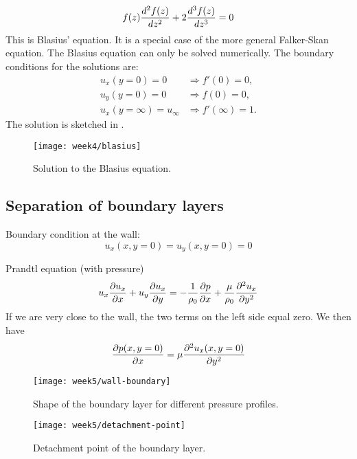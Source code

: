 \begin{equation}
f(z)\frac{d^2 f(z)}{d z^2}+2\frac{d^3 f(z)}{d z^3}=0
\end{equation}
This is Blasius' equation. It is a special case of the more general Falker-Skan equation. The Blasius equation can only be solved numerically. The boundary conditions for the solutions are:
\begin{align}
u_x(y=0)=0&\Rightarrow f'(0)=0, \\
u_y(y=0)=0&\Rightarrow f(0)=0, \\
u_x(y=\infty)=u_\infty&\Rightarrow f'(\infty)=1.
\end{align}
The solution is sketched in .
\begin{figure}[!h]
    \centering
    \texttt{[image: week4/blasius]}\\
    \caption{Solution to the Blasius equation.}
    \label{fig:blasius}
\end{figure}


\subsection{Separation of boundary layers}
Boundary condition at the wall:
\begin{equation}
u_x(x,y=0) = u_y(x,y=0)=0
\end{equation}

Prandtl equation (with pressure)
\begin{equation}
u_x\frac{\partial u_x}{\partial x}+u_y\frac{\partial u_x}{\partial y} = -\frac{1}{\rho_0}\frac{\partial p}{\partial x}+\frac{\mu}{\rho_0}\frac{\partial^2 u_x}{\partial y^2}
\end{equation}
If we are very close to the wall, the two terms on the left side equal zero. We then have
\begin{equation}
\frac{\partial p(x,y=0)}{\partial x}=\mu\frac{\partial^2 u_x(x,y=0)}{\partial y^2}
\end{equation}

\begin{figure}[!h]
    \centering
    \texttt{[image: week5/wall-boundary]}\\
    \caption{Shape of the boundary layer for different pressure profiles.}
    \label{fig:wall-boundary}
\end{figure}

\begin{figure}[!h]
    \centering
    \texttt{[image: week5/detachment-point]}\\
    \caption{Detachment point of the boundary layer.}
    \label{fig:detachment-point}
\end{figure}

